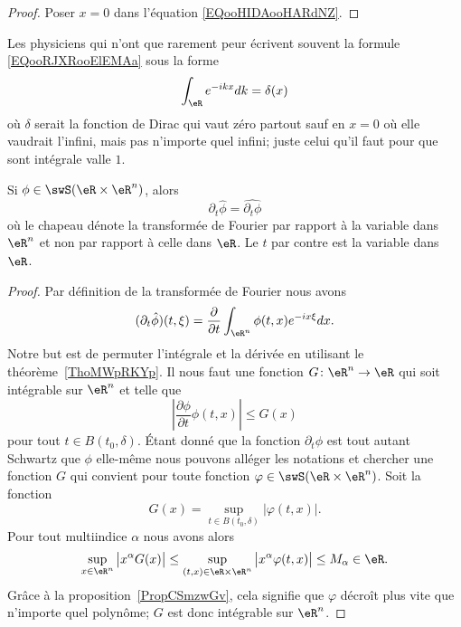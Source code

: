 \begin{proof}
	Poser \( x=0\) dans l'équation \eqref{EQooHIDAooHARdNZ}.
\end{proof}

\begin{normaltext}
	Les physiciens qui n'ont que rarement peur écrivent souvent la formule \eqref{EQooRJXRooElEMAa} sous la forme
	\begin{equation}
		\int_{\eR} e^{-ikx}dk=\delta(x)
	\end{equation}
	où \( \delta\) serait la fonction de Dirac qui vaut zéro partout sauf en \( x=0\) où elle vaudrait l'infini, mais pas n'importe quel infini; juste celui qu'il faut pour que sont intégrale valle \( 1\).
\end{normaltext}

\begin{lemma}   \label{LemYYjFZSa}
	Si \( \phi\in\swS(\eR\times \eR^n)\), alors
	\begin{equation}
		\partial_t\hat\phi=\widehat{\partial_t\phi}
	\end{equation}
	où le chapeau dénote la transformée de Fourier par rapport à la variable dans \( \eR^n\) et non par rapport à celle dans \( \eR\). Le \( t\) par contre est la variable dans \( \eR\).
\end{lemma}

\begin{proof}
	Par définition de la transformée de Fourier nous avons
	\begin{equation}
		(\partial_t\hat\phi)(t,\xi)=\frac{ \partial  }{ \partial t }\int_{\eR^n}\phi(t,x) e^{-i x\xi}dx.
	\end{equation}
	Notre but est de permuter l'intégrale et la dérivée en utilisant le théorème~\ref{ThoMWpRKYp}. Il nous faut une fonction \( G\colon \eR^n\to \eR\) qui soit intégrable sur \( \eR^n\) et telle que
	\begin{equation}
		\left| \frac{ \partial \phi }{ \partial t }\phi(t,x) \right| \leq G(x)
	\end{equation}
	pour tout \( t\in B(t_0,\delta)\). Étant donné que la fonction \( \partial_t\phi\) est tout autant Schwartz que \( \phi\) elle-même nous pouvons alléger les notations et chercher une fonction \( G\) qui convient pour toute fonction \( \varphi\in\swS(\eR\times \eR^n)\). Soit la fonction
	\begin{equation}
		G(x)=\sup_{t\in B(t_0,\delta)}| \varphi(t,x) |.
	\end{equation}
	Pour tout multiindice \( \alpha\) nous avons alors
	\begin{equation}
		\sup_{x\in \eR^n}\big| x^{\alpha}G(x) \big|\leq \sup_{(t,x)\in \eR\times \eR^n}\big| x^{\alpha}\varphi(t,x) \big|\leq M_{\alpha}\in \eR.
	\end{equation}
	Grâce à la proposition~\ref{PropCSmzwGv}, cela signifie que \( \varphi\) décroît plus vite que n'importe quel polynôme; \( G\) est donc intégrable sur \( \eR^n\).
\end{proof}


